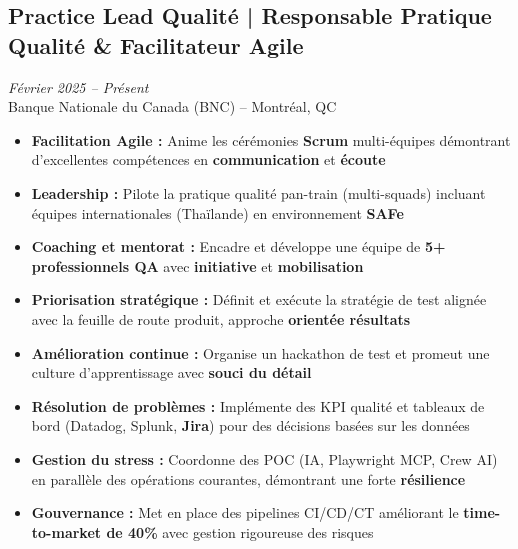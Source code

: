 \documentclass[11pt,a4paper]{article}
\newcommand{\highlight}[1]{\textcolor{primaryblue}{\textbf{#1}}}
\newcommand{\keypoint}[1]{\textbf{#1}}
\begin{document}
\subsection*{Practice Lead Qualité | Responsable Pratique Qualité \& Facilitateur Agile} \hfill \textit{\color{mediumgray}Février 2025 -- Présent}\\
Banque Nationale du Canada (BNC) -- Montréal, QC
\begin{itemize}[leftmargin=22pt]
    \item \highlight{Facilitation Agile :} Anime les cérémonies \highlight{Scrum} multi-équipes démontrant d'excellentes compétences en \highlight{communication} et \highlight{écoute}
    \item \highlight{Leadership :} Pilote la pratique qualité pan-train (multi-squads) incluant équipes internationales (Thaïlande) en environnement \highlight{SAFe}
    \item \highlight{Coaching et mentorat :} Encadre et développe une équipe de \keypoint{5+ professionnels QA} avec \highlight{initiative} et \highlight{mobilisation}
    \item \highlight{Priorisation stratégique :} Définit et exécute la stratégie de test alignée avec la feuille de route produit, approche \highlight{orientée résultats}
    \item \highlight{Amélioration continue :} Organise un hackathon de test et promeut une culture d'apprentissage avec \highlight{souci du détail}
    \item \highlight{Résolution de problèmes :} Implémente des KPI qualité et tableaux de bord (Datadog, Splunk, \highlight{Jira}) pour des décisions basées sur les données
    \item \highlight{Gestion du stress :} Coordonne des POC (IA, Playwright MCP, Crew AI) en parallèle des opérations courantes, démontrant une forte \highlight{résilience}
    \item \highlight{Gouvernance :} Met en place des pipelines CI/CD/CT améliorant le \keypoint{time-to-market de 40\%} avec gestion rigoureuse des risques
\end{itemize}
\end{document}
